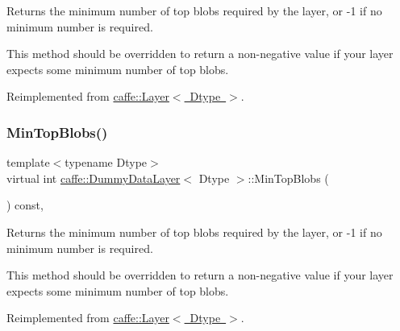 Returns the minimum number of top blobs required by the layer, or -\/1 if no minimum number is required. 

This method should be overridden to return a non-\/negative value if your layer expects some minimum number of top blobs. 

Reimplemented from \mbox{\hyperlink{classcaffe_1_1_layer_ab9e4c8d642e413948b131d851a8462a4}{caffe\+::\+Layer$<$ Dtype $>$}}.

\mbox{\label{classcaffe_1_1_dummy_data_layer_a2a63e36dd6b39287981d0bee466975aa}} 
\subsubsection{\texorpdfstring{Min\+Top\+Blobs()}{MinTopBlobs()}\hspace{0.1cm}{\footnotesize\ttfamily [2/2]}}
{\footnotesize\ttfamily template$<$typename Dtype$>$ \\
virtual int \mbox{\hyperlink{classcaffe_1_1_dummy_data_layer}{caffe\+::\+Dummy\+Data\+Layer}}$<$ Dtype $>$\+::Min\+Top\+Blobs (\begin{DoxyParamCaption}{ }\end{DoxyParamCaption}) const\hspace{0.3cm}{\ttfamily [inline]}, {\ttfamily [virtual]}}



Returns the minimum number of top blobs required by the layer, or -\/1 if no minimum number is required. 

This method should be overridden to return a non-\/negative value if your layer expects some minimum number of top blobs. 

Reimplemented from \mbox{\hyperlink{classcaffe_1_1_layer_ab9e4c8d642e413948b131d851a8462a4}{caffe\+::\+Layer$<$ Dtype $>$}}.

\mbox{\label{classcaffe_1_1_dummy_data_layer_ae72f2ea80339981bf925f0291f62d527}} 
